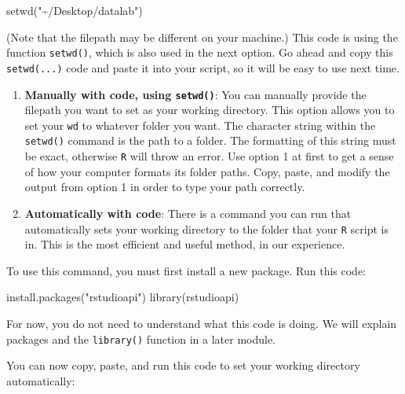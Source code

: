 \documentclass[
]{book}
\newenvironment{Shaded}{\begin{snugshade}}{\end{snugshade}}
\newcommand{\FunctionTok}[1]{\textcolor[rgb]{0.00,0.00,0.00}{#1}}
\newcommand{\NormalTok}[1]{#1}
\newcommand{\SpecialCharTok}[1]{\textcolor[rgb]{0.00,0.00,0.00}{#1}}
\newcommand{\StringTok}[1]{\textcolor[rgb]{0.31,0.60,0.02}{#1}}
\begin{document}
\begin{Shaded}
\begin{Highlighting}[]
\FunctionTok{setwd}\NormalTok{(}\StringTok{"\textasciitilde{}/Desktop/datalab"}\NormalTok{)}
\end{Highlighting}
\end{Shaded}

(Note that the filepath may be different on your machine.) This code is using the function \texttt{setwd()}, which is also used in the next option. Go ahead and copy this \texttt{setwd(...)} code and paste it into your script, so it will be easy to use next time.

\begin{enumerate}
\def\labelenumi{\arabic{enumi}.}
\setcounter{enumi}{1}
\item
  \textbf{Manually with code, using \texttt{setwd()}}: You can manually provide the filepath you want to set as your working directory. This option allows you to set your \texttt{wd} to whatever folder you want. The character string within the \texttt{setwd()} command is the path to a folder. The formatting of this string must be exact, otherwise \texttt{R} will throw an error. Use option 1 at first to get a sense of how your computer formats its folder paths. Copy, paste, and modify the output from option 1 in order to type your path correctly.
\item
  \textbf{Automatically with code}: There is a command you can run that automatically sets your working directory to the folder that your \texttt{R} script is in. This is the most efficient and useful method, in our experience.
\end{enumerate}

To use this command, you must first install a new package. Run this code:

\begin{Shaded}
\begin{Highlighting}[]
\FunctionTok{install.packages}\NormalTok{(}\StringTok{"rstudioapi"}\NormalTok{)}
\FunctionTok{library}\NormalTok{(rstudioapi)}
\end{Highlighting}
\end{Shaded}

For now, you do not need to understand what this code is doing. We will explain packages and the \texttt{library()} function in a later module.

You can now copy, paste, and run this code to set your working directory automatically:

\begin{Shaded}
\end{Shaded}
\end{document}

